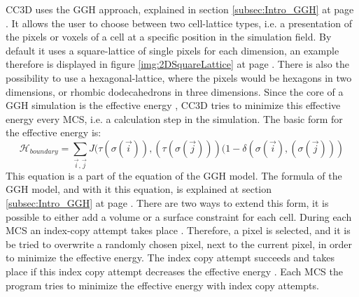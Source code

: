CC3D uses the \ac{GGH} approach, explained in section \ref{subsec:Intro_GGH} at page \pageref{subsec:Intro_GGH}. It allows the user to choose between two cell-lattice types, i.e. a presentation of the pixels or voxels of a cell at a specific position in the simulation field. By default it uses a square-lattice of single pixels for each dimension, an example therefore is displayed in figure \ref{img:2DSquareLattice} at page \pageref{img:2DSquareLattice}. There is also the possibility to use a hexagonal-lattice, where the pixels would be hexagons in two dimensions, or rhombic dodecahedrons in three dimensions.
Since the core of a \ac{GGH} simulation is the effective energy \cite{MaciejH.Swat2017}, \ac{CC3D} tries to minimize this effective energy every \ac{MCS}, i.e. a calculation step in the simulation. The basic form for the effective energy is:
\begin{equation}
\mathcal{H}_{boundary} = \sum_{\vec{i},\vec{j}}^{ }{J(\tau(\sigma(\vec{i})),(\tau(\sigma(\vec{j})))(1-\delta(\sigma(\vec{i}),(\sigma(\vec{j})))}
\end{equation}
This equation is a part of the equation of the \ac{GGH} model. The formula of the \ac{GGH} model, and with it this equation, is explained at section \ref{subsec:Intro_GGH} at page \pageref{subsec:Intro_GGH}. \newline
There are two ways to extend this form, it is possible to either add a volume or a surface constraint for each cell. During each \ac{MCS} an index-copy attempt takes place \cite{MaciejH.Swat2017}. Therefore, a pixel is selected, and it is be tried to overwrite a randomly chosen pixel, next to the current pixel, in order to minimize the effective energy. The index copy attempt succeeds and takes place if this index copy attempt decreases the effective energy \cite{MaciejH.Swat2017}. Each \ac{MCS} the program tries to minimize the effective energy with index copy attempts.


